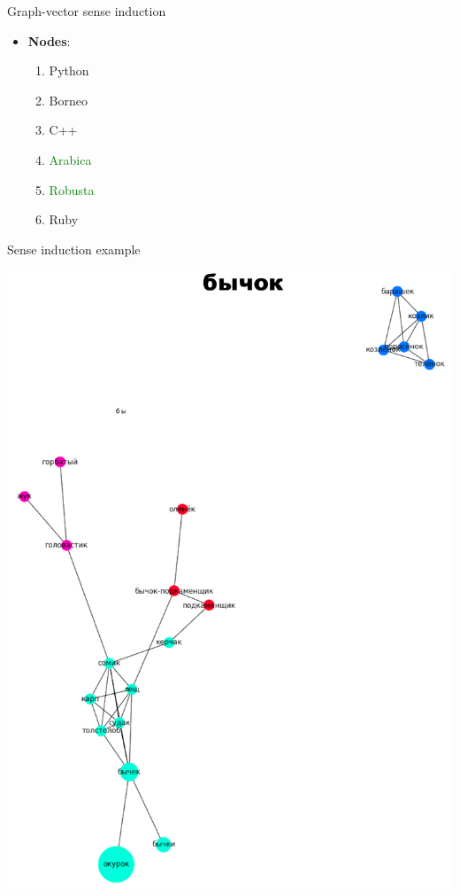 \begin{frame}{ Graph-vector sense induction }
\begin{itemize}

\item \textbf{Nodes}:

	\begin{enumerate}
	\item \alert{Python}
	\item \textcolor{Cerulean}{Borneo}
	\item \alert{C++}
	\item \textcolor{Green}{Arabica}
    \item \textcolor{Green}{Robusta}
	\item \alert{Ruby}
\end{enumerate}

\end{itemize}
\end{frame}





\begin{frame}{ Sense induction example}


 \begin{center}
  	\includegraphics[height=0.68\textheight]{figures/bychok}
  \end{center}
  
\end{frame}







